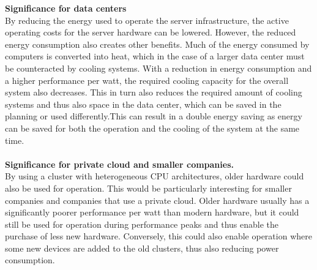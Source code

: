 \textbf{Significance for data centers}\\
By reducing the energy used to operate the server infrastructure, the active operating costs for the server hardware can be lowered. However, the reduced energy consumption also creates other benefits. Much of the energy consumed by computers is converted into heat, which in the case of a larger data center must be counteracted by cooling systems. With a reduction in energy consumption and a higher performance per watt, the required cooling capacity for the overall system also decreases. This in turn also reduces the required amount of cooling systems and thus also space in the data center, which can be saved in the planning or used differently.This can result in a double energy saving as energy can be saved for both the operation and the cooling of the system at the same time.
\\
\\
\textbf{Significance for private cloud and smaller companies.}
\\
By using a cluster with heterogeneous CPU architectures, older hardware could also be used for operation. This would be particularly interesting for smaller companies and companies that use a private cloud. Older hardware usually has a significantly poorer performance per watt than modern hardware, but it could still be used for operation during performance peaks and thus enable the purchase of less new hardware.
Conversely, this could also enable operation where some new devices are added to the old clusters, thus also reducing power consumption.
